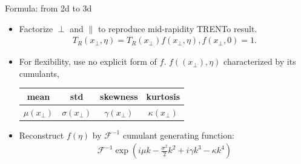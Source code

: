 \documentclass[11pt]{beamer}
\begin{document}
\begin{frame}{Formula: from 2d to 3d}
\begin{itemize}
\item Factorize $\perp$ and $\parallel$ to reproduce mid-rapidity TRENTo result.
\begin{eqnarray}
	T_R(x_\perp, \eta) = T_R(x_\perp)f(x_\perp, \eta), f(x_\perp, 0) = 1.
\end{eqnarray}
\item For flexibility, use no explicit form of $f$. $f((x_\perp), \eta)$ characterized by its cumulants,

\begin{center}
\begin{tabular}{c|c|c|c}
\hline
	mean	 	&	std   	&	skewness		&	kurtosis		\\
\hline
	$\mu(x_\perp)$	& $\sigma(x_\perp)$ & $\gamma(x_\perp)$ & $\kappa(x_\perp)$	\\
\hline
\end{tabular}
\end{center}

\item Reconstruct $ f(\eta) $ by $\mathscr{F}^{-1}$ cumulant generating function:
\begin{eqnarray}\label{naive_fourier}
	 \mathscr{F}^{-1}\exp\left(i \mu k - \frac{\sigma^2}{2}k^2 + i \gamma k^3 - \kappa k^4 \right)
\end{eqnarray}
\end{itemize}
\end{frame}
\end{document}

